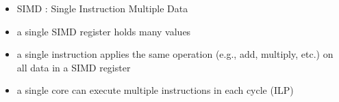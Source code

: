\documentclass[12pt,dvipdfmx]{beamer}
\begin{document}
\begin{frame}
\begin{columns}
\begin{column}{0.4\textwidth}
\begin{center}
\end{center}
\end{column}
\begin{column}{0.6\textwidth}
\begin{center}
\def\svgwidth{0.7\textwidth}

\end{center}
\end{column}
\end{columns}

\begin{itemize}
\item SIMD : Single Instruction Multiple Data
\item a single SIMD register holds many values
\item a single instruction applies the same operation (e.g., add, multiply, etc.)
  on all data in a SIMD register
\item a single core can execute multiple instructions in each cycle (ILP)
\end{itemize}
\end{frame}
\end{document}
